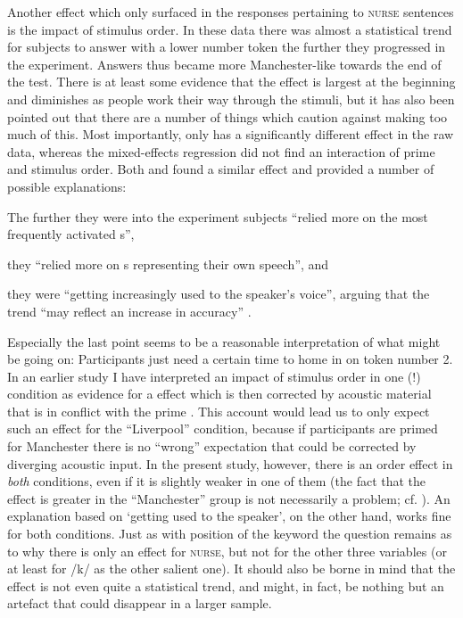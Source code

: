 Another effect which only surfaced in the responses pertaining to \textsc{nurse} sentences is the impact of stimulus order.
In these data there was almost a statistical trend for subjects to answer with a lower number token the further they progressed in the experiment.
Answers thus became more Manchester-like towards the end of the test.
There is at least some evidence that the  effect is largest at the beginning and diminishes as people work their way through the stimuli, but it has also been pointed out that there are a number of things which caution against making too much of this.
Most importantly,  only has a significantly different effect in the raw data, whereas the mixed-effects regression did not find an interaction of prime and stimulus order.
Both \textcite{hayetal2006a} and \textcite{haydrager2010} found a similar effect and provided a number of possible explanations:
	\begin{inparaenum}[(1)]
		\item The further they were into the experiment subjects ``relied more on the most frequently activated s'',
		\item they ``relied more on s representing their own speech'', and
		\item they were ``getting increasingly used to the speaker's voice'', arguing that the trend ``may reflect an increase in accuracy'' \parencite[881--882]{haydrager2010}.
	\end{inparaenum}

Especially the last point seems to be a reasonable interpretation of what might be going on: Participants just need a certain time to home in on token number 2.
In an earlier study I have interpreted an impact of stimulus order in one (!) condition as evidence for a  effect which is then corrected by acoustic material that is in conflict with the prime \parencite{juskanma}.
This account would lead us to only expect such an effect for the ``Liverpool'' condition, because if participants are primed for Manchester there is no ``wrong'' expectation that could be corrected by diverging acoustic input.
In the present study, however, there is an order effect in \emph{both} conditions, even if it is slightly weaker in one of them (the fact that the effect is greater in the ``Manchester'' group is not necessarily a problem; cf. ).
An explanation based on `getting used to the speaker', on the other hand, works fine for both conditions.
Just as with position of the keyword the question remains as to why there is only an effect for \textsc{nurse}, but not for the other three variables (or at least for /k/ as the other salient one).
It should also be borne in mind that the effect is not even quite a statistical trend, and might, in fact, be nothing but an artefact that could disappear in a larger sample.

